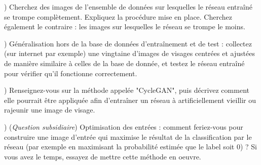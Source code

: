 \documentclass[a4paper,11pt]{article}
\begin{document}
) Cherchez des images de l'ensemble de données sur lesquelles le réseau entraîné se trompe complètement. Expliquez la procédure mise en place. Cherchez également le contraire : les images sur lesquelles le réseau se trompe le moins.
\newline

) Généralisation hors de la base de données d'entraînement et de test : collectez (sur internet par exemple) une vingtaine d'images de visages centrées et ajustées de manière similaire à celles de la base de donnée, et testez le réseau entraîné pour vérifier qu'il fonctionne correctement.
\newline

) Renseignez-vous sur la méthode appelée "CycleGAN", puis décrivez comment elle pourrait être appliquée afin d'entraîner un réseau à artificiellement vieillir ou rajeunir une image de visage.
\newline 

) (\emph{Question subsidiaire}) Optimisation des entrées : comment feriez-vous pour construire une image d'entrée qui maximise le résultat de la classification par le réseau (par exemple en maximisant la probabilité estimée que le label soit 0) ? Si vous avez le temps, essayez de mettre cette méthode en oeuvre.
\end{document}
